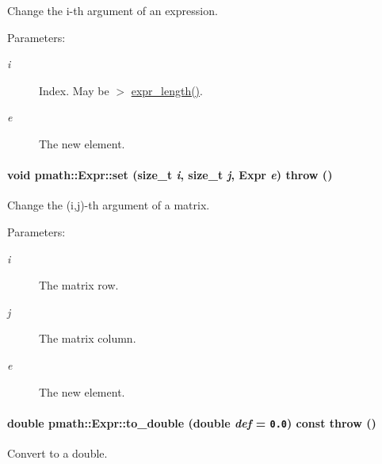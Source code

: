 Change the i-th argument of an expression. 

\begin{Desc}
\item[Parameters:]
\begin{description}
\item[{\em i}]Index. May be $>$ \hyperlink{classpmath_1_1_expr_1c8347cf339bc5bf4c593542c7ba6772}{expr\_\-length()}. \item[{\em e}]The new element. \end{description}
\end{Desc}
\hypertarget{classpmath_1_1_expr_7891114e80246ac205bf1bc2179319e3}{
\paragraph[{set}]{\setlength{\rightskip}{0pt plus 5cm}void pmath::Expr::set (size\_\-t {\em i}, \/  size\_\-t {\em j}, \/  {\bf Expr} {\em e})  throw ()}\hfill}
\label{classpmath_1_1_expr_7891114e80246ac205bf1bc2179319e3}


Change the (i,j)-th argument of a matrix. 

\begin{Desc}
\item[Parameters:]
\begin{description}
\item[{\em i}]The matrix row. \item[{\em j}]The matrix column. \item[{\em e}]The new element. \end{description}
\end{Desc}
\hypertarget{classpmath_1_1_expr_69a3a8aea77a499ec61f13616c92db86}{
\paragraph[{to\_\-double}]{\setlength{\rightskip}{0pt plus 5cm}double pmath::Expr::to\_\-double (double {\em def} = {\tt 0.0}) const  throw ()}\hfill}
\label{classpmath_1_1_expr_69a3a8aea77a499ec61f13616c92db86}


Convert to a double. 

